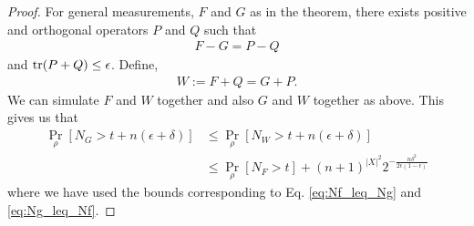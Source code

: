 \documentclass[11pt, oneside]{article}   	%
\begin{document}
\begin{proof}
    For general measurements, $F$ and $G$ as in the theorem, there exists positive and orthogonal operators $P$ and $Q$ such that  
    \begin{align}
        F - G = P - Q 
    \end{align}
    and $\operatorname{tr}(P+Q) \leq \epsilon$. Define, 
    \begin{align}
        W := F + Q = G + P.
    \end{align}
    We can simulate $F$ and $W$ together and also $G$ and $W$ together as above. This gives us that 
    \begin{align*}
        \Pr_\rho[N_G > t + n(\epsilon+\delta)] &\leq \Pr_\rho[N_W > t+ n(\epsilon+\delta)] \\
        & \leq \Pr_\rho[N_F > t] + (n+1)^{|X|^2} 2^{- \frac{n \delta^2}{2\epsilon(1- \epsilon)}}
    \end{align*}
    where we have used the bounds corresponding to Eq. \ref{eq:Nf_leq_Ng} and \ref{eq:Ng_leq_Nf}.
\end{proof}
\end{document}
